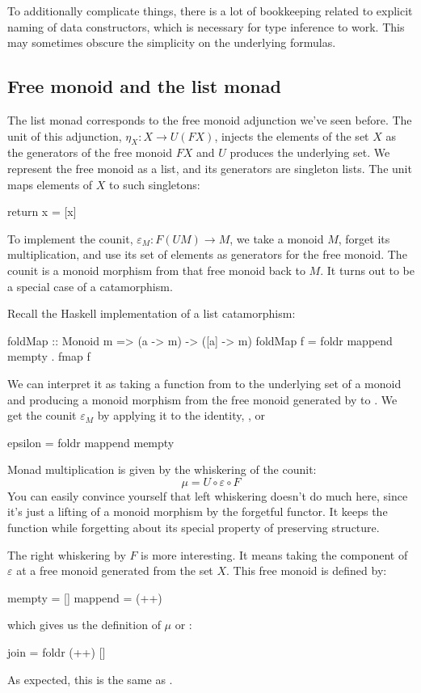 \documentclass[DaoFP]{subfiles}
\begin{document}
To additionally complicate things, there is a lot of bookkeeping related to explicit naming of data constructors, which is necessary for type inference to work. This may sometimes obscure the simplicity on the underlying formulas.

\subsection{Free monoid and the list monad}
The list monad corresponds to the free monoid adjunction we've seen before. The unit of this adjunction, $\eta_X \colon X \to U (F X)$, injects the elements of the set $X$ as the generators of the free monoid $F X$ and $U$ produces the underlying set. We represent the free monoid as a list, and its generators are singleton lists. The unit maps elements of $X$ to such singletons:
\begin{haskell}
return x = [x]
\end{haskell}
To implement the counit, $\varepsilon_M \colon F (U M) \to M$, we take a monoid $M$, forget its multiplication, and use its set of elements as generators for the free monoid. The counit is a monoid morphism from that free monoid back to $M$. It turns out to be a special case of a catamorphism. 

Recall the Haskell implementation of a list catamorphism:
\begin{haskell}
foldMap :: Monoid m => (a -> m) -> ([a] -> m)
foldMap f = foldr mappend mempty . fmap f
\end{haskell}
We can interpret it as taking a function from  to the underlying set of a monoid  and producing a monoid morphism from the free monoid generated by  to . We get the counit $\varepsilon_M$ by applying it to the identity, , or 
\begin{haskell}
epsilon = foldr mappend mempty
\end{haskell}
Monad multiplication is given by the whiskering of the counit:
\[ \mu = U \circ \varepsilon \circ F \]
You can easily convince yourself that left whiskering doesn't do much here, since it's just a lifting of a monoid morphism by the forgetful functor. It keeps the function while forgetting about its special property of preserving structure. 

The right whiskering by $F$ is more interesting. It means taking the component of $\varepsilon$ at a free monoid generated from the set $X$. This  free monoid is defined by:
\begin{haskell}
mempty = []
mappend = (++)
\end{haskell}
which gives us the definition of $\mu$ or :
\begin{haskell}
join = foldr (++) []
\end{haskell}
As expected, this is the same as .
\end{document}
